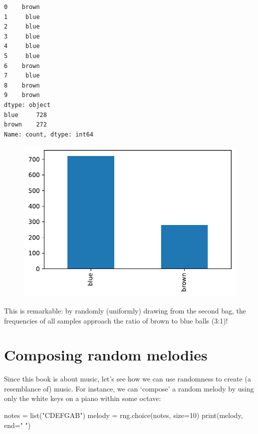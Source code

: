 \documentclass[
  a4paperpaper,
  ,captions=tableheading
]{scrbook}
\newenvironment{Shaded}{\begin{snugshade}}{\end{snugshade}}
\newcommand{\BuiltInTok}[1]{\textcolor[rgb]{0.00,0.23,0.31}{#1}}
\newcommand{\DecValTok}[1]{\textcolor[rgb]{0.68,0.00,0.00}{#1}}
\newcommand{\NormalTok}[1]{\textcolor[rgb]{0.00,0.23,0.31}{#1}}
\newcommand{\OperatorTok}[1]{\textcolor[rgb]{0.37,0.37,0.37}{#1}}
\newcommand{\StringTok}[1]{\textcolor[rgb]{0.13,0.47,0.30}{#1}}
\begin{document}
\begin{verbatim}
0    brown
1     blue
2     blue
3     blue
4     blue
5     blue
6    brown
7     blue
8    brown
9    brown
dtype: object
blue     728
brown    272
Name: count, dtype: int64
\end{verbatim}

\begin{figure}[H]

{\centering \includegraphics{randomness_files/figure-pdf/cell-5-output-2.pdf}

}

\end{figure}

This is remarkable: by randomly (uniformly) drawing from the second bag,
the frequencies of all samples approach the ratio of brown to blue balls
(3:1)!

\hypertarget{composing-random-melodies}{%
\section{Composing random melodies}\label{composing-random-melodies}}

Since this book is about music, let's see how we can use randomness to
create (a resemblance of) music. For instance, we can `compose' a random
melody by using only the white keys on a piano within some octave:

\begin{Shaded}
\begin{Highlighting}[]
\NormalTok{notes }\OperatorTok{=} \BuiltInTok{list}\NormalTok{(}\StringTok{"CDEFGAB"}\NormalTok{)}
\NormalTok{melody }\OperatorTok{=}\NormalTok{ rng.choice(notes, size}\OperatorTok{=}\DecValTok{10}\NormalTok{)}
\BuiltInTok{print}\NormalTok{(melody, end}\OperatorTok{=}\StringTok{" "}\NormalTok{)}
\end{Highlighting}
\end{Shaded}
\end{document}
